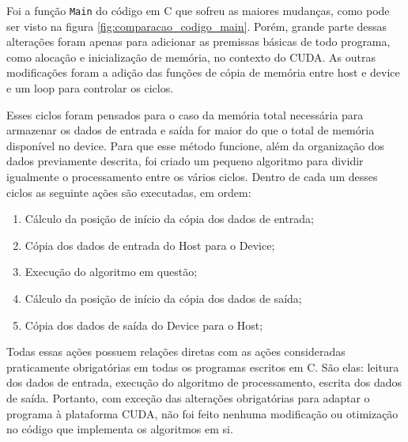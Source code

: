 Foi a função \texttt{Main} do código em C que sofreu as maiores mudanças, como pode ser visto na figura \ref{fig:comparacao_codigo_main}. Porém, grande parte dessas alterações foram apenas para adicionar as premissas básicas de todo programa, como alocação e inicialização de memória, no contexto do CUDA. As outras modificações foram a adição das funções de cópia de memória entre host e device e um loop para controlar os ciclos.

Esses ciclos foram pensados para o caso da memória total necessária para armazenar os dados de entrada e saída for maior do que o total de memória disponível no device. Para que esse método funcione, além da organização dos dados previamente descrita, foi criado um pequeno algoritmo para dividir igualmente o processamento entre os vários ciclos. Dentro de cada um desses ciclos as seguinte ações são executadas, em ordem:

\begin{enumerate}
\item Cálculo da posição de início da cópia dos dados de entrada;
\item Cópia dos dados de entrada do Host para o Device;
\item Execução do algoritmo em questão;
\item Cálculo da posição de início da cópia dos dados de saída;
\item Cópia dos dados de saída do Device para o Host;
\end{enumerate}

Todas essas ações possuem relações diretas com as ações consideradas praticamente obrigatórias em todas os programas escritos em C. São elas: leitura dos dados de entrada, execução do algoritmo de processamento, escrita dos dados de saída. Portanto, com exceção das alterações obrigatórias para adaptar o programa à plataforma CUDA, não foi feito nenhuma modificação ou otimização no código que implementa os algoritmos em si.

